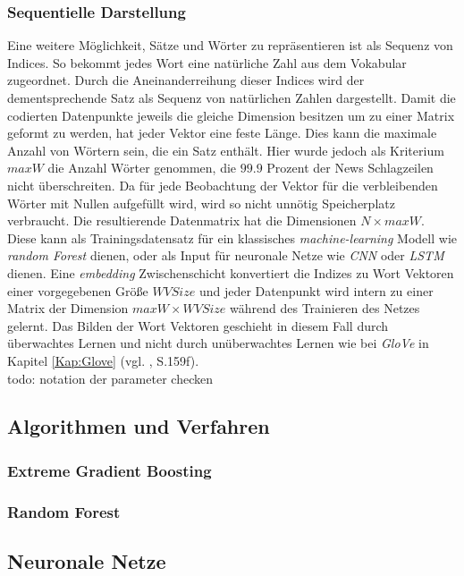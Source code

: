 \documentclass[a4paper,11pt]{article}
\begin{document}
\subsubsection{Sequentielle Darstellung} \label{Kap:Seq}

Eine weitere Möglichkeit, Sätze und Wörter zu repräsentieren ist als Sequenz von Indices. So bekommt jedes Wort eine natürliche Zahl aus dem Vokabular zugeordnet. Durch die Aneinanderreihung dieser Indices wird der dementsprechende Satz als Sequenz von natürlichen Zahlen dargestellt. Damit die codierten Datenpunkte jeweils die gleiche Dimension besitzen um zu einer Matrix geformt zu werden, hat jeder Vektor eine feste Länge. Dies kann die maximale Anzahl von Wörtern sein, die ein Satz enthält. Hier wurde jedoch als Kriterium $maxW$ die Anzahl Wörter genommen, die $99.9$ Prozent der News Schlagzeilen nicht überschreiten.
Da für jede Beobachtung der Vektor für die verbleibenden Wörter mit Nullen aufgefüllt wird, wird so nicht unnötig Speicherplatz verbraucht. Die resultierende Datenmatrix hat die Dimensionen $N \times maxW$. Diese kann als Trainingsdatensatz für ein klassisches \textit{machine-learning} Modell wie \textit{random Forest} dienen, oder als Input für neuronale Netze wie \textit{CNN} oder \textit{LSTM} dienen. Eine \textit{embedding} Zwischenschicht konvertiert die Indizes zu Wort Vektoren einer vorgegebenen Größe $WVSize$ und jeder Datenpunkt wird intern zu einer Matrix der Dimension $maxW \times WVSize$ während des Trainieren des Netzes gelernt. Das Bilden der Wort Vektoren geschieht in diesem Fall durch überwachtes Lernen und nicht durch unüberwachtes Lernen wie bei \textit{GloVe} in Kapitel \ref{Kap:Glove} (vgl. \cite{keras}, S.159f).\\

todo: notation der parameter checken


\subsection{Algorithmen und Verfahren}

\subsubsection{Extreme Gradient Boosting}
\subsubsection{Random Forest}

\subsection{Neuronale Netze} \label{kap:neuralNets}
\end{document}

